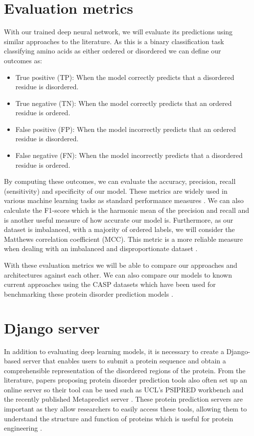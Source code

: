 \documentclass{l4proj}
\begin{document}
\section{Evaluation metrics}
\label{chap:analysis sec:evaluation}
With our trained deep neural network, we will evaluate its predictions using similar approaches to the literature. As this is a binary classification task classifying amino acids as either ordered or disordered we can define our outcomes as: 

\begin{itemize}    
    \item True positive (TP): When the model correctly predicts that a disordered residue is disordered.
    \item True negative (TN): When the model correctly predicts that an ordered residue is ordered.
    \item False positive (FP): When the model incorrectly predicts that an ordered residue is disordered.
    \item False negative (FN): When the model incorrectly predicts that a disordered residue is ordered. \citep{google_TP}
\end{itemize}

By computing these outcomes, we can evaluate the accuracy, precision, recall (sensitivity) and specificity of our model. These metrics are widely used in various machine learning tasks as standard performance measures \citep{BC:wiki}. We can also calculate the F1-score which is the harmonic mean of the precision and recall and is another useful measure of how accurate our model is. Furthermore, as our dataset is imbalanced, with a majority of ordered labels, we will consider the Matthews correlation coefficient (MCC). This metric is a more reliable measure when dealing with an imbalanced and disproportionate dataset \citep{Chicco:20}.

With these evaluation metrics we will be able to compare our approaches and architectures against each other. We can also compare our models to known current approaches using the CASP datasets which have been used for benchmarking these protein disorder prediction models \citep{casp}.

\section{Django server}

In addition to evaluating deep learning models, it is necessary to create a Django-based server that enables users to submit a protein sequence and obtain a comprehensible representation of the disordered regions of the protein. From the literature, papers proposing protein disorder prediction tools also often set up an online server so their tool can be used such as UCL's PSIPRED workbench \citep{Jones:19} and the recently published Metapredict server \citep{Metapredict:server}. These protein prediction servers are important as they allow researchers to easily access these tools, allowing them to understand the structure and function of proteins which is useful for protein engineering \citep{prot_engineering:wiki}. 
\end{document}
